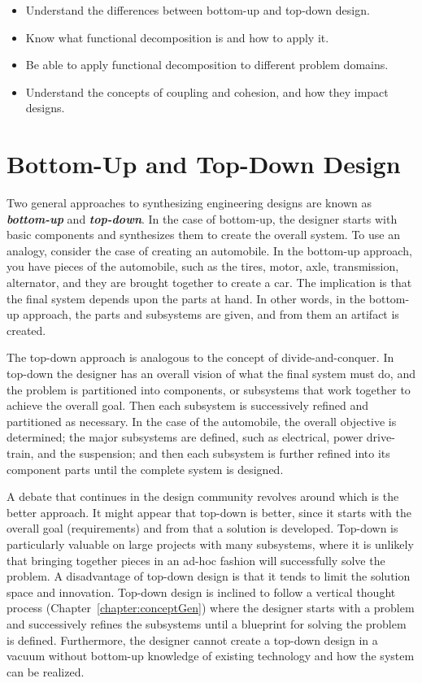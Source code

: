 \begin{itemize}
\item
  Understand the differences between bottom-up and top-down design.
\item
  Know what functional decomposition is and how to apply it.
\item
  Be able to apply functional decomposition to different problem
  domains.
\item
  Understand the concepts of coupling and cohesion, and how they impact
  designs.
\end{itemize}

\section{Bottom-Up and Top-Down Design}
\label{section:bottom-up-and-top-down-design}

Two general approaches to synthesizing engineering designs are known as
\emph{\textbf{bottom-up}} and \emph{\textbf{top-down}}. In the case of
bottom-up, the designer starts with basic components and synthe­sizes
them to create the overall system. To use an analogy, consider the case
of creating an automobile. In the bottom-up approach, you have pieces of
the automobile, such as the tires, motor, axle, transmission,
alternator, and they are brought together to create a car. The
impli­cation is that the final system depends upon the parts at hand. In
other words, in the bottom-up approach, the parts and subsystems are
given, and from them an artifact is created.

The top-down approach is analogous to the concept of divide-and-conquer.
In top-down the designer has an overall vision of what the final system
must do, and the problem is parti­tioned into components, or subsystems
that work together to achieve the overall goal. Then each subsystem is
successively refined and partitioned as necessary. In the case of the
auto­mobile, the overall objective is determined; the major subsystems
are defined, such as electri­cal, power drive-train, and the suspension;
and then each subsystem is further refined into its component parts
until the complete system is designed.

A debate that continues in the design community revolves around which is
the better ap­proach. It might appear that top-down is better, since it
starts with the over­all goal (requirements) and from that a solution is
developed. Top-down is particularly valu­able on large projects with many
subsystems, where it is unlikely that bringing together pieces in an
ad-hoc fashion will successfully solve the problem. A disadvantage of
top-down design is that it tends to limit the solution space and
innovation. Top-down design is inclined to follow a vertical thought
process 
(Chapter~\ref{chapter:conceptGen}) 
where the designer starts with a problem and
succes­sively refines the subsystems until a blueprint for solving the
problem is defined. Further­more, the designer cannot create a top-down
design in a vacuum without bottom-up knowl­edge of existing technology
and how the system can be realized.

